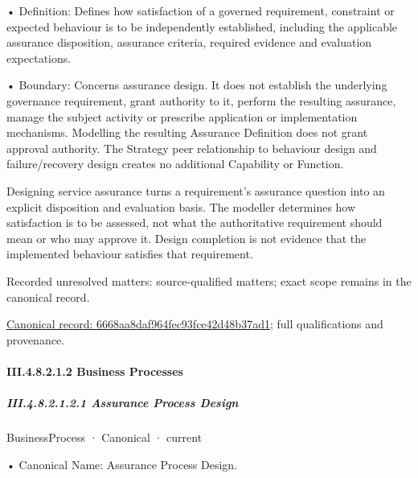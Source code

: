 •
Definition: Defines how satisfaction of a governed requirement, constraint or expected behaviour is to be independently established, including the applicable assurance disposition, assurance criteria, required evidence and evaluation expectations.



•
Boundary: Concerns assurance design. It does not establish the underlying governance requirement, grant authority to it, perform the resulting assurance, manage the subject activity or prescribe application or implementation mechanisms. Modelling the resulting Assurance Definition does not grant approval authority. The Strategy peer relationship to behaviour design and failure/recovery design creates no additional Capability or Function.



Designing service assurance turns a requirement's assurance question into an explicit disposition and evaluation basis. The modeller determines how satisfaction is to be assessed, not what the authoritative requirement should mean or who may approve it. Design completion is not evidence that the implemented behaviour satisfies that requirement.


{\small Recorded unresolved matters: source-qualified matters; exact scope remains in the canonical record.}\par
{\footnotesize \href{../../../../../../../../continuum/business/business-function/6668aa8daf964fec93fce42d48b37ad1.md}{Canonical record: 6668aa8daf964fec93fce42d48b37ad1}; full qualifications and provenance.}\par
\paragraph*{III.4.8.2.1.2 Business Processes}
\label{navigation:III.4.8.2.1.2}

\subparagraph*{III.4.8.2.1.2.1 Assurance Process Design}
\label{navigation:III.4.8.2.1.2.1}

\label{element:aec3177dcdd84961814f2ba4f688ad33}
{\small BusinessProcess · Canonical · current}\par

•
Canonical Name: Assurance Process Design.



